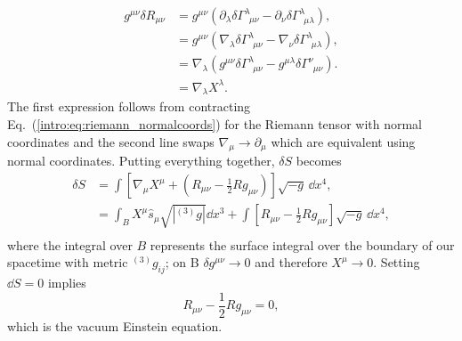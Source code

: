 \begin{align}
g^{\mu\nu} \delta R_{\mu\nu} &= g^{\mu\nu}\left( \partial_\lambda \delta\Gamma^{\lambda}_{\,\,\,\mu\nu} - \partial_\nu \delta\Gamma^{\lambda}_{\,\,\,\mu\lambda} \right), \\
&= g^{\mu\nu}\left( \nabla_\lambda \delta\Gamma^{\lambda}_{\,\,\,\mu\nu} - \nabla_\nu \delta\Gamma^{\lambda}_{\,\,\,\mu\lambda} \right), \\
&= \nabla_\lambda \left( g^{\mu\nu} \delta\Gamma^{\lambda}_{\,\,\,\mu\nu} - g^{\mu\lambda} \delta\Gamma^{\nu}_{\,\,\,\mu\nu} \right). \\
&=\nabla_\lambda X^\lambda.
\end{align}
The first expression follows from contracting Eq.~(\ref{intro:eq:riemann_normalcoords}) for the Riemann tensor with normal coordinates and the second line swaps $\nabla_\mu \rightarrow \partial_\mu$ which are equivalent using normal coordinates. Putting everything together, $\delta S$ becomes
\begin{align}
\delta S &= \int \left[ \nabla_\mu X^\mu + \left( R_{\mu\nu}-\frac{1}{2}Rg_{\mu\nu}\right)\right]\sqrt{-g}\,\dd x^4, \\
&= \int_B X^\mu \hat{s}_\mu \sqrt{|{}^{(3)}g|}\dd x^3 + \int \left[  R_{\mu\nu}-\frac{1}{2}Rg_{\mu\nu}\right]\sqrt{-g}\,\dd x^4, \\
\end{align}
where the integral over $B$ represents the surface integral over the boundary of our spacetime with metric ${}^{(3)}g_{ij}$; on B $\delta g^{\mu\nu}\rightarrow 0 $ and therefore $X^\mu \rightarrow 0$. Setting $\dd S =0$ implies
\begin{equation}
R_{\mu\nu}-\frac{1}{2}Rg_{\mu\nu}=0,
\end{equation} 
which is the vacuum Einstein equation.

